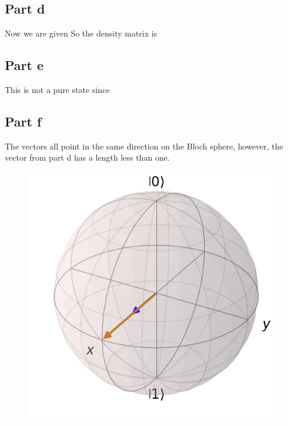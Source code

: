 \subsection*{Part d}
Now we are given
So the density matrix is
\subsection*{Part e}
This is not a pure state since
\subsection*{Part f}
The vectors all point in the same direction on the Bloch sphere, however, the vector from part d has a length less than one.
\begin{figure}[H]
    \centering
    \includegraphics[width=0.75\linewidth]{Resources//245//Homework 9/245 Homework 9 Problem 2f.png}
    \label{fig:enter-label}
\end{figure}

